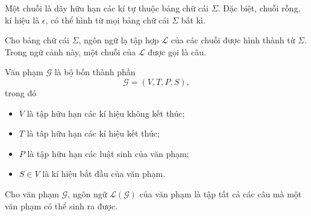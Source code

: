 \begin{defn}[Chuỗi]
  Một chuỗi là dãy hữu hạn các kí tự thuộc bảng chữ cái $\Sigma$. Đặc biệt,
  chuỗi rỗng, kí hiệu là $\epsilon$, có thể hình từ mọi bảng chữ cái $\Sigma$
  bất kì.
\end{defn}

\begin{defn}
  Cho bảng chữ cái $\Sigma$, ngôn ngữ lạ tập hợp $\mathcal{L}$ của các chuỗi
  được hình thành từ $\Sigma$. Trong ngữ cảnh này, một chuỗi của $\mathcal{L}$
  được gọi là câu.
\end{defn}

\begin{defn}
  Văn phạm $\mathcal{G}$ là bộ bốn thành phần \begin{equation}
    \mathcal{G} = (V, T, P, S),
  \end{equation} trong đó \begin{itemize}
    \item $V$ là tập hữu hạn các kí hiệu không kết thúc;
    \item $T$ là tâp hữu hạn các kí hiệu kết thúc;
    \item $P$ là tập hữu hạn các luật sinh của văn phạm;
    \item $S \in V$ là kí hiệu bắt đầu của văn phạm.
  \end{itemize}
\end{defn}

\begin{defn}
  Cho văn phạm $\mathcal{G}$, ngôn ngữ $\mathcal{L}(\mathcal{G})$ của văn phạm
  là tập tất cả các câu mà một văn phạm có thể sinh ra được.
\end{defn}

